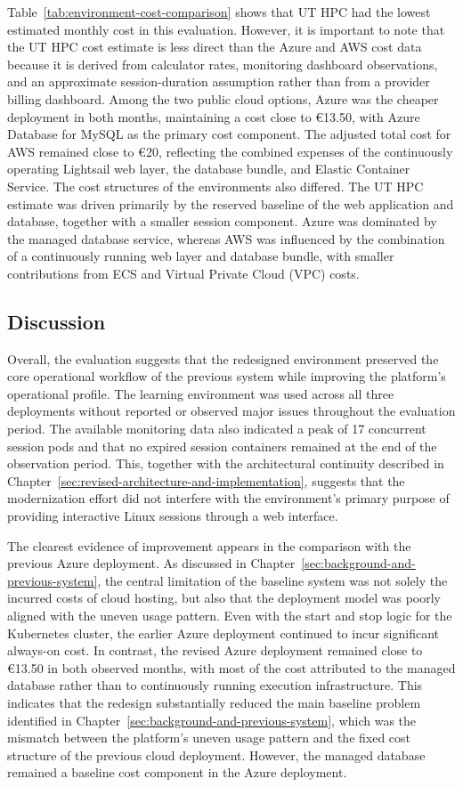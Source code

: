 Table~\ref{tab:environment-cost-comparison} shows that UT HPC had the lowest estimated monthly cost in this evaluation.
However, it is important to note that the UT HPC cost estimate is less direct than the Azure and AWS cost data because it is derived from calculator rates, monitoring dashboard observations, and an approximate session-duration assumption rather than from a provider billing dashboard.
Among the two public cloud options, Azure was the cheaper deployment in both months, maintaining a cost close to €13.50, with Azure Database for MySQL as the primary cost component.
The adjusted total cost for AWS remained close to €20, reflecting the combined expenses of the continuously operating Lightsail web layer, the database bundle, and Elastic Container Service.
The cost structures of the environments also differed.
The UT HPC estimate was driven primarily by the reserved baseline of the web application and database, together with a smaller session component.
Azure was dominated by the managed database service, whereas AWS was influenced by the combination of a continuously running web layer and database bundle, with smaller contributions from ECS and Virtual Private Cloud (VPC) costs.

\subsection{Discussion} \label{subsec:discussion}
Overall, the evaluation suggests that the redesigned environment preserved the core operational workflow of the previous system while improving the platform's operational profile.
The learning environment was used across all three deployments without reported or observed major issues throughout the evaluation period.
The available monitoring data also indicated a peak of 17 concurrent session pods and that no expired session containers remained at the end of the observation period.
This, together with the architectural continuity described in Chapter~\ref{sec:revised-architecture-and-implementation}, suggests that the modernization effort did not interfere with the environment's primary purpose of providing interactive Linux sessions through a web interface.

The clearest evidence of improvement appears in the comparison with the previous Azure deployment.
As discussed in Chapter~\ref{sec:background-and-previous-system}, the central limitation of the baseline system was not solely the incurred costs of cloud hosting, but also that the deployment model was poorly aligned with the uneven usage pattern.
Even with the start and stop logic for the Kubernetes cluster, the earlier Azure deployment continued to incur significant always-on cost.
In contrast, the revised Azure deployment remained close to €13.50 in both observed months, with most of the cost attributed to the managed database rather than to continuously running execution infrastructure.
This indicates that the redesign substantially reduced the main baseline problem identified in Chapter~\ref{sec:background-and-previous-system}, which was the mismatch between the platform's uneven usage pattern and the fixed cost structure of the previous cloud deployment.
However, the managed database remained a baseline cost component in the Azure deployment.

